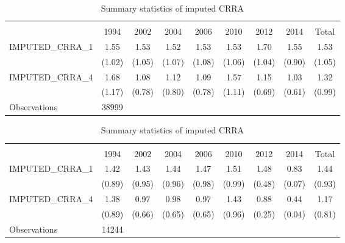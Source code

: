 \begin{table}[htbp]\centering \caption{Summary statistics of imputed CRRA} \begin{tabular}{l*{8}{c}} \hline\hline
                    &\multicolumn{8}{c}{}                                                                                   \\
                    &        1994&        2002&        2004&        2006&        2010&        2012&        2014&       Total\\
\hline
IMPUTED\_CRRA\_1      &        1.55&        1.53&        1.52&        1.53&        1.53&        1.70&        1.55&        1.53\\
                    &      (1.02)&      (1.05)&      (1.07)&      (1.08)&      (1.06)&      (1.04)&      (0.90)&      (1.05)\\
[1em]
IMPUTED\_CRRA\_4      &        1.68&        1.08&        1.12&        1.09&        1.57&        1.15&        1.03&        1.32\\
                    &      (1.17)&      (0.78)&      (0.80)&      (0.78)&      (1.11)&      (0.69)&      (0.61)&      (0.99)\\
\hline
Observations        &       38999&            &            &            &            &            &            &            \\
\hline\hline
\end{tabular}
\end{table}
\begin{table}[htbp]\centering \caption{Summary statistics of imputed CRRA} \begin{tabular}{l*{8}{c}} \hline\hline
                    &\multicolumn{8}{c}{}                                                                                   \\
                    &        1994&        2002&        2004&        2006&        2010&        2012&        2014&       Total\\
\hline
IMPUTED\_CRRA\_1      &        1.42&        1.43&        1.44&        1.47&        1.51&        1.48&        0.83&        1.44\\
                    &      (0.89)&      (0.95)&      (0.96)&      (0.98)&      (0.99)&      (0.48)&      (0.07)&      (0.93)\\
[1em]
IMPUTED\_CRRA\_4      &        1.38&        0.97&        0.98&        0.97&        1.43&        0.88&        0.44&        1.17\\
                    &      (0.89)&      (0.66)&      (0.65)&      (0.65)&      (0.96)&      (0.25)&      (0.04)&      (0.81)\\
\hline
Observations        &       14244&            &            &            &            &            &            &            \\
\hline\hline
\end{tabular}
\end{table}

